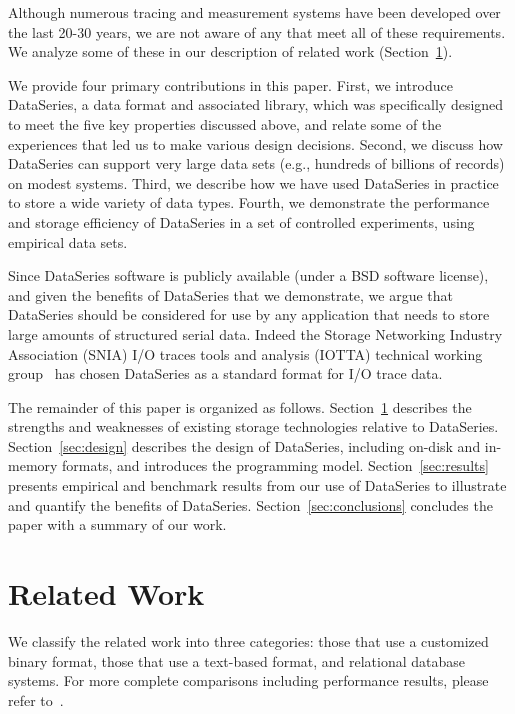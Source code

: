 \documentclass{acm_proc_article-sp}
\begin{document}
Although numerous tracing and measurement systems have been developed
over the last 20-30 years, we are not aware of any that meet all of
these requirements. We analyze some of these in our description of
related work (Section~\ref{sec:related}).

We provide four primary contributions in this paper.  First, we
introduce DataSeries, a data format and associated library, which was
specifically designed to meet the five key properties discussed above,
and relate some of the experiences that led us to make various
design decisions. 
Second, we discuss how DataSeries can support very large data sets
(e.g., hundreds of billions of records) on modest systems.  Third, we
describe how we have used DataSeries in practice to store a wide
variety of data types.  Fourth, we demonstrate the performance and
storage efficiency of DataSeries in a set of controlled experiments,
using empirical data sets. 

Since DataSeries software is publicly available (under a BSD software
license), and given the benefits of DataSeries that we demonstrate, we
argue that DataSeries should be considered for use by any application
that needs to store large amounts of structured serial data. Indeed
the Storage Networking Industry Association (SNIA) I/O traces tools
and analysis (IOTTA) technical working group~\cite{iotta-website} has
chosen DataSeries as a standard format for I/O trace data.

The remainder of this paper is organized as follows.
Section~\ref{sec:related} describes the strengths and weaknesses of
existing storage technologies relative to DataSeries.
Section~\ref{sec:design} describes the design of DataSeries, including
on-disk and in-memory formats, and introduces the programming model.
Section~\ref{sec:results} presents empirical and benchmark results
from our use of DataSeries to illustrate and quantify the benefits of
DataSeries. Section~\ref{sec:conclusions} concludes the
paper with a summary of our work.

\section{Related Work}\label{sec:related}

We classify the related work into three categories:
those that use a customized binary format, those that use a
text-based format, and relational database systems. 
For more complete comparisons including performance
results, please refer to~\cite{DSTechnicalReportSnapshot}.
\end{document}
